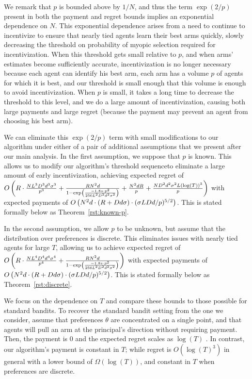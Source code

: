 We remark that $p$ is bounded above by $1/N$, and thus the term $\exp(2/p)$ present in both the payment and regret bounds implies an exponential dependence on $N$.  This exponential dependence arises from a need to continue to incentivize to ensure that nearly tied agents learn their best arms quickly, slowly decreasing the threshold on probability of myopic selection required for incentivization.  When this threshold gets small relative to $p$, and when arms' estimates become sufficiently accurate, incentivization is no longer necessary because each agent can identify his best arm, each arm has a volume $p$ of agents for which it is best, and our threshold is small enough that this volume is enough to avoid incentivization.  When $p$ is small, it takes a long time to decrease the threshold to this level, and we do a large amount of incentivization, causing both large payments and large regret (because the payment may prevent an agent from choosing his best arm).

We can eliminate this $\exp(2/p)$ term with small modifications to our algorithm under either of a pair of additional assumptions that we present after our main analysis.  In the first assumption, we suppose that $p$ is known.  This allows us to modify our algorithm's threshold sequenceto eliminate a large amount of early incentivization, achieving 
expected regret of
$O \left(R\cdot \frac{N L^3 D^3 d^3 \sigma^3}{p^3}
  + \frac{R N^2 d}{1 - \exp \left(
    \frac{-1.8 s \cdot p^2}{256 L^2 D^2 d^2 \sigma^2}
  \right)} +\frac{N^2 dR}{p}+\frac{ND^2 d^2\sigma^2 L(\log(T))^3}{p}\right)$
with expected payments of 
$O \left(N^2 d \cdot (R + D d \sigma) \cdot (\sigma LD d / p)^{5/2} \right)$.
This is stated formally below as Theorem~\ref{rst:known-p}.

In the second assumption, we allow $p$ to be unknown, but assume that the distribution over preferences is discrete.  This eliminates issues with nearly tied agents for large $T$, allowing us to achieve expected regret of 
$O \left(R\cdot \frac{N L^4 D^4 d^4 \sigma^4}{p^4}
  + \frac{R N^2 d}{1 - \exp \left(
    \frac{-1.8 s \cdot p^2}{256 L^2 D^2 d^2 \sigma^2}
  \right)} \right)$ 
  with expected payments of $O \left(N^2 d \cdot (R + D d \sigma) \cdot (\sigma LD d / p)^{5/2} \right)$.
This is stated formally below as Theorem~\ref{rst:discrete}.


We focus on the dependence on $T$ and compare these bounds to those possible for standard bandits.  
To recover the standard bandit setting from the one we consider, assume that preferences $\theta$ are concentrated on a single point, and that agents will pull an arm at the principal's direction without requiring payment.  Then, the payment is $0$ and the expected regret scales as $\log(T)$ \cite[Theorem 2.1]{bubeck2012regret}.
In contrast, our algorithm's payment is constant in $T$; 
while regret is $O(\log(T)^3)$ in general with a lower bound of $\Omega(\log(T))$,  
and constant in $T$ when preferences are discrete.

